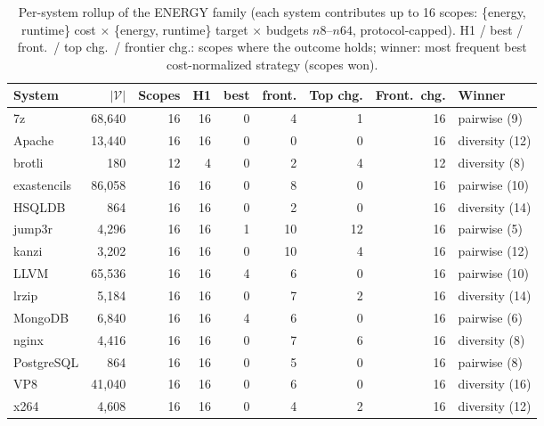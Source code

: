 \begin{table}[t]
  \centering\small
  \caption{Per-system rollup of the ENERGY family (each system contributes
  up to 16 scopes: \{energy, runtime\} cost $\times$ \{energy, runtime\}
  target $\times$ budgets $n8$--$n64$, protocol-capped). H1 / \srs{} best /
  \srs{} front.\ / top chg.\ / frontier chg.: scopes where the outcome
  holds; winner: most frequent best cost-normalized strategy (scopes won).}
  \label{tab:appendix-energy}
  \setlength{\tabcolsep}{4pt}
  \begin{tabular}{@{}lrrrrrrrl@{}}
    \toprule
    System & $|\mathcal{V}|$ & Scopes & H1 & \srs{} best & \srs{} front. & Top chg. & Front.\ chg. & Winner \\
    \midrule
    7z & 68,640 & 16 & 16 & 0 & 4 & 1 & 16 & \textsf{pairwise} (9) \\
    Apache & 13,440 & 16 & 16 & 0 & 0 & 0 & 16 & \textsf{diversity} (12) \\
    brotli & 180 & 12 & 4 & 0 & 2 & 4 & 12 & \textsf{diversity} (8) \\
    exastencils & 86,058 & 16 & 16 & 0 & 8 & 0 & 16 & \textsf{pairwise} (10) \\
    HSQLDB & 864 & 16 & 16 & 0 & 2 & 0 & 16 & \textsf{diversity} (14) \\
    jump3r & 4,296 & 16 & 16 & 1 & 10 & 12 & 16 & \textsf{pairwise} (5) \\
    kanzi & 3,202 & 16 & 16 & 0 & 10 & 4 & 16 & \textsf{pairwise} (12) \\
    LLVM & 65,536 & 16 & 16 & 4 & 6 & 0 & 16 & \textsf{pairwise} (10) \\
    lrzip & 5,184 & 16 & 16 & 0 & 7 & 2 & 16 & \textsf{diversity} (14) \\
    MongoDB & 6,840 & 16 & 16 & 4 & 6 & 0 & 16 & \textsf{pairwise} (6) \\
    nginx & 4,416 & 16 & 16 & 0 & 7 & 6 & 16 & \textsf{diversity} (8) \\
    PostgreSQL & 864 & 16 & 16 & 0 & 5 & 0 & 16 & \textsf{pairwise} (8) \\
    VP8 & 41,040 & 16 & 16 & 0 & 6 & 0 & 16 & \textsf{diversity} (16) \\
    x264 & 4,608 & 16 & 16 & 0 & 4 & 2 & 16 & \textsf{diversity} (12) \\
    \bottomrule
  \end{tabular}
\end{table}
